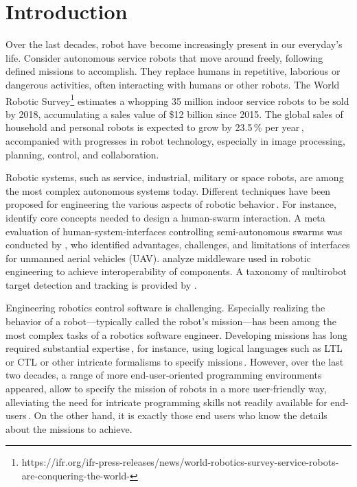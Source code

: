 \section{Introduction}
Over the last decades, robot have become increasingly present in our everyday's life. Consider autonomous service robots that move around freely, following defined missions to accomplish. They replace humans in repetitive, laborious or dangerous activities, often interacting with humans or other robots. The World Robotic Survey\footnote{https://ifr.org/ifr-press-releases/news/world-robotics-survey-service-robots-are-conquering-the-world-} estimates a whopping 35 million indoor service robots to be sold by 2018, accumulating a sales value of \$12 billion since 2015. The global sales of household and personal robots is expected to grow by 23.5\,\% per year\,\cite{sheng:online}, accompanied with progresses in robot technology, especially in image processing, planning, control, and collaboration.

Robotic systems, such as service, industrial, military or space robots, are among the most complex autonomous systems today. Different techniques have been proposed for engineering the various aspects of robotic behavior\,\cite{Fernandez-Perdomo2010,DiRuscio2014,Doherty2013,AtrickD..Ulam2010}. For instance, \citet{Kolling2016} identify core concepts needed to design a human-swarm interaction. A meta evaluation of human-system-interfaces controlling semi-autonomous swarms was conducted by \citet{Hocraffer2017}, who identified advantages, challenges, and limitations of interfaces for unmanned aerial vehicles (UAV). \citet{Mohamed2008} analyze middleware used in robotic engineering to achieve interoperability of components. A taxonomy of multirobot target detection and tracking is provided by \citet{Robin2016}.

Engineering robotics control software is challenging. Especially realizing the behavior of a robot---typically called the robot's mission---has been among the most complex tasks of a robotics software engineer. Developing missions has long required substantial expertise\,\cite{Brugali2009,Aragao2016}, for instance, using logical languages such as LTL or CTL or other intricate formalisms to specify missions\,\cite{Luckcuck2018}.
However, over the last two decades, a range of more end-user-oriented programming environments appeared, allow to specify the mission of robots in a more user-friendly way, alleviating the need for intricate programming skills not readily available for end-users\,\cite{Weintrop2018,Bozhinoski2016b}. On the other hand, it is exactly those end users who know the details about the missions to achieve.

